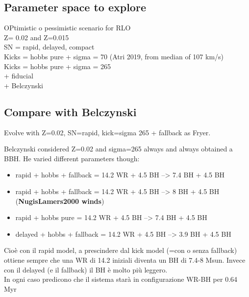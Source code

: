 \documentclass[a4paper,titlepage]{book}     	%
\begin{document}
\subsection{Parameter space to explore}
OPtimistic o pessimistic scenario for RLO \\
Z= 0.02 and Z=0.015\\
SN = rapid, delayed, compact \\
Kicks = hobbs pure + sigma = 70 (Atri 2019, from median of 107 km/s) \\
Kicks = hobbs pure + sigma = 265 \\
+ fiducial \\
+ Belczynski


\subsection{Compare with Belczynski}
Evolve with Z=0.02, SN=rapid, kick=sigma 265 + fallback as Fryer.


Belczynski considered Z=0.02 and sigma=265 always and always obtained a BBH. He varied different parameters though:
\begin{itemize}
	\item rapid + hobbs + fallback = 14.2 WR + 4.5 BH --> 7.4 BH + 4.5 BH
	\item rapid + hobbs + fallback = 14.2 WR + 4.5 BH --> 8 BH + 4.5 BH (\textbf{NugisLamers2000 winds})
	\item rapid + hobbs pure = 14.2 WR + 4.5 BH --> 7.4 BH + 4.5 BH
	\item delayed + hobbs + fallback = 14.2 WR + 4.5 BH --> 3.9 BH + 4.5 BH
\end{itemize}

Cioè con il rapid model, a prescindere dal kick model (=con o senza fallback) ottiene sempre che una WR di 14.2 iniziali diventa un BH di 7.4-8 Msun. Invece con il delayed (e il fallback) il BH è molto più leggero.\\

In ogni caso predicono che il sistema starà in configurazione WR-BH per 0.64 Myr
\end{document}
